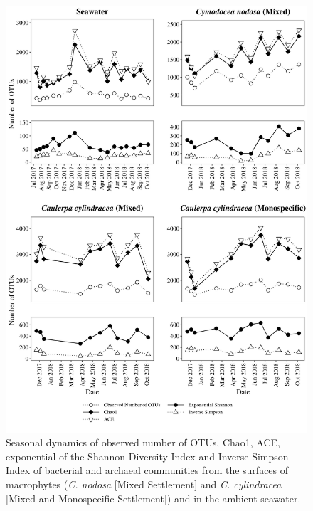 \documentclass[12pt,]{article}
\begin{document}
\begin{figure}[H]

{\centering \includegraphics[width=0.85\linewidth]{../results/figures/calculators} 

}

\caption{Seasonal dynamics of observed number of OTUs, Chao1, ACE, exponential of the Shannon Diversity Index and Inverse Simpson Index of bacterial and archaeal communities from the surfaces of macrophytes (\textit{C. nodosa} [Mixed Settlement] and \textit{C. cylindracea} [Mixed and Monospecific Settlement]) and in the ambient seawater.\label{calculators}}\label{fig:unnamed-chunk-2}
\end{figure}
\end{document}
